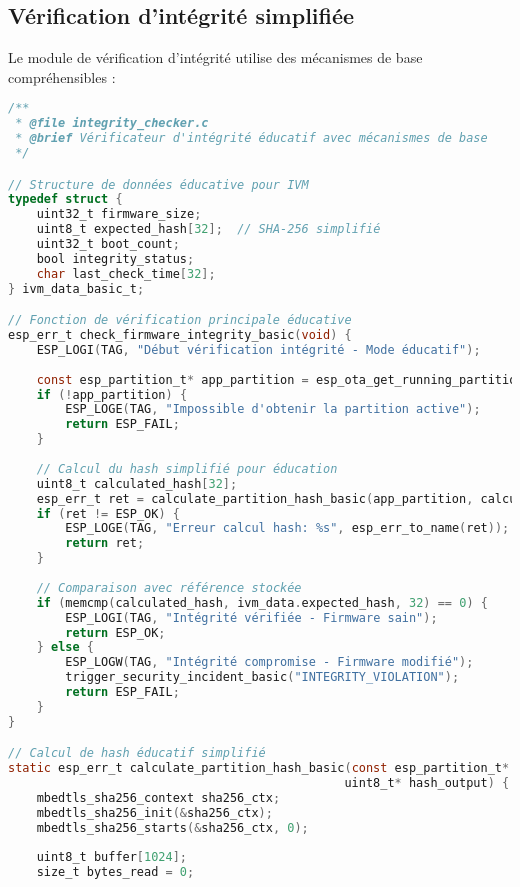 \subsection{Vérification d'intégrité simplifiée}

Le module de vérification d'intégrité utilise des mécanismes de base compréhensibles :

\begin{lstlisting}[language=C, caption={Module de vérification d'intégrité - integrity\_checker.c}, label=lst:integrity-checker]
/**
 * @file integrity_checker.c
 * @brief Vérificateur d'intégrité éducatif avec mécanismes de base
 */

// Structure de données éducative pour IVM
typedef struct {
    uint32_t firmware_size;
    uint8_t expected_hash[32];  // SHA-256 simplifié
    uint32_t boot_count;
    bool integrity_status;
    char last_check_time[32];
} ivm_data_basic_t;

// Fonction de vérification principale éducative
esp_err_t check_firmware_integrity_basic(void) {
    ESP_LOGI(TAG, "Début vérification intégrité - Mode éducatif");
    
    const esp_partition_t* app_partition = esp_ota_get_running_partition();
    if (!app_partition) {
        ESP_LOGE(TAG, "Impossible d'obtenir la partition active");
        return ESP_FAIL;
    }
    
    // Calcul du hash simplifié pour éducation
    uint8_t calculated_hash[32];
    esp_err_t ret = calculate_partition_hash_basic(app_partition, calculated_hash);
    if (ret != ESP_OK) {
        ESP_LOGE(TAG, "Erreur calcul hash: %s", esp_err_to_name(ret));
        return ret;
    }
    
    // Comparaison avec référence stockée
    if (memcmp(calculated_hash, ivm_data.expected_hash, 32) == 0) {
        ESP_LOGI(TAG, "Intégrité vérifiée - Firmware sain");
        return ESP_OK;
    } else {
        ESP_LOGW(TAG, "Intégrité compromise - Firmware modifié");
        trigger_security_incident_basic("INTEGRITY_VIOLATION");
        return ESP_FAIL;
    }
}

// Calcul de hash éducatif simplifié
static esp_err_t calculate_partition_hash_basic(const esp_partition_t* partition, 
                                               uint8_t* hash_output) {
    mbedtls_sha256_context sha256_ctx;
    mbedtls_sha256_init(&sha256_ctx);
    mbedtls_sha256_starts(&sha256_ctx, 0);
    
    uint8_t buffer[1024];
    size_t bytes_read = 0;
    

\end{lstlisting}

